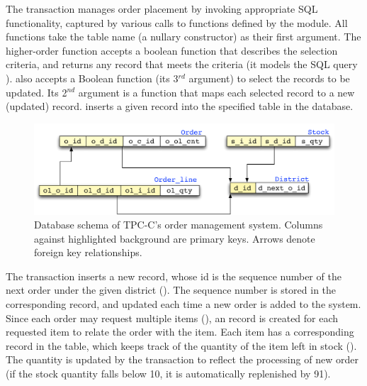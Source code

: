 The transaction manages order placement by invoking appropriate SQL
functionality, captured by various calls to functions defined by the
 module. All  functions take the table name (a nullary
constructor) as their first argument. The higher-order 
function accepts a boolean function that describes the selection
criteria, and returns any record that meets the criteria (it models
the SQL query \C{SELECT \ldots\xspace LIMIT 1}).  also
accepts a Boolean function (its 3$^{rd}$ argument) to select the records to be
updated. Its 2$^{nd}$ argument is a function that maps each selected
record to a new (updated) record.  inserts a given
record into the specified table in the database.


\begin{figure}[!t]
\includegraphics[scale=0.5]{Figures/schema}
\caption{Database schema of TPC-C's order management system.
  Columns against highlighted background are primary keys. Arrows denote
  foreign key relationships.}
\label{fig:schema}
\end{figure}

The  transaction inserts a new  record, whose
id is the sequence number of the next order under the given district
(). The sequence number is stored in the corresponding
 record, and updated each time a new order is added to the
system. Since each order may request multiple items (),
an  record is created for each requested item to relate
the order with the item. Each item has a corresponding record in the
 table, which keeps track of the quantity of the item left in
stock (). The quantity is updated by the transaction to
reflect the processing of new order (if the stock quantity falls below
10, it is automatically replenished by 91).

